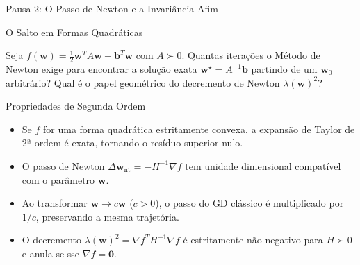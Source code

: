 \documentclass[aspectratio=169, 10pt]{beamer}
\newenvironment{callouttip}[1][Dica]{%
  \begin{exampleblock}{#1}%
}{%
  \end{exampleblock}%
}
\newcommand{\qmark}{\textbf{$\square$}}
\begin{document}
\begin{frame}{Pausa 2: O Passo de Newton e a Invariância Afim}
  \begin{callouttip}[O Salto em Formas Quadráticas]
    Seja $f(\mathbf{w}) = \frac{1}{2}\mathbf{w}^T A \mathbf{w} - \mathbf{b}^T \mathbf{w}$ com $A \succ 0$. Quantas iterações o Método de Newton exige para encontrar a solução exata $\mathbf{w}^\star = A^{-1}\mathbf{b}$ partindo de um $\mathbf{w}_0$ arbitrário? Qual é o papel geométrico do decremento de Newton $\lambda(\mathbf{w})^2$?
  \end{callouttip}

  \begin{callouttip}[Propriedades de Segunda Ordem]
    \begin{itemize}
      \item[\qmark] Se $f$ for uma forma quadrática estritamente convexa, a expansão de Taylor de 2ª ordem é exata, tornando o resíduo superior nulo.
      \item[\qmark] O passo de Newton $\Delta\mathbf{w}_{\text{nt}} = -H^{-1}\nabla f$ tem unidade dimensional compatível com o parâmetro $\mathbf{w}$.
      \item[\qmark] Ao transformar $\mathbf{w} \to c \mathbf{w}$ ($c > 0$), o passo do GD clássico é multiplicado por $1/c$, preservando a mesma trajetória.
      \item[\qmark] O decremento $\lambda(\mathbf{w})^2 = \nabla f^T H^{-1} \nabla f$ é estritamente não-negativo para $H \succ 0$ e anula-se sse $\nabla f = \mathbf{0}$.
    \end{itemize}
  \end{callouttip}
\end{frame}
\end{document}
